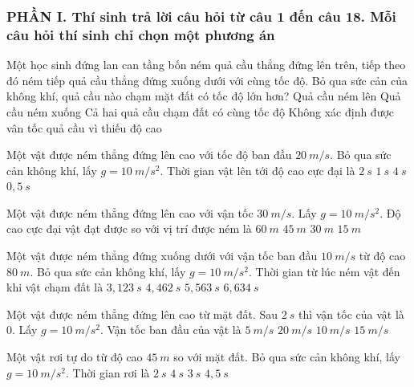\subsubsection*{PHẦN I. Thí sinh trả lời câu hỏi từ câu 1 đến câu 18. Mỗi câu hỏi thí sinh chỉ chọn một phương án}
\setcounter{ex}{0}
\begin{ex}%
Một học sinh đứng lan can tầng bốn ném quả cầu thẳng đứng lên trên, tiếp theo đó ném tiếp quả cầu thẳng đứng xuống dưới với cùng tốc độ. Bỏ qua sức cản của không khí, quả cầu nào chạm mặt đất có tốc độ lớn hơn?
\choice 
{Quả cầu ném lên}
{Quả cầu ném xuống}
{\True Cả hai quả cầu chạm đất có cùng tốc độ}
{Không xác định được vân tốc quả cầu vì thiếu độ cao}
\loigiai{}
\end{ex}
\begin{ex}
Một vật được ném thẳng đứng lên cao với tốc độ ban đầu $20\ m/s$. Bỏ qua sức cản không khí, lấy $g = 10\ m/s^2$. Thời gian vật lên tới độ cao cực đại là
\choice
{\True $2\ s$}
{$1\ s$}
{$4\ s$}
{$0,5\ s$}
\loigiai{}
\end{ex}

\begin{ex}
Một vật được ném thẳng đứng lên cao với vận tốc $30\ m/s$. Lấy $g = 10\ m/s^2$. Độ cao cực đại vật đạt được so với vị trí được ném là
\choice
{$60\ m$}
{\True $45\ m$}
{$30\ m$}
{$15\ m$}
\loigiai{}
\end{ex}

\begin{ex}
Một vật được ném thẳng đứng xuống dưới với vận tốc ban đầu $10\ m/s$ từ độ cao $80\ m$. Bỏ qua sức cản không khí, lấy $g = 10\ m/s^2$. Thời gian từ lúc ném vật đến khi vật chạm đất là
\choice
{$3,123\ s$}
{\True $4,462\ s$}
{$5,563\ s$}
{$6,634\ s$}
\loigiai{}
\end{ex}

\begin{ex}
Một vật được ném thẳng đứng lên cao từ mặt đất. Sau $2\ s$ thì vận tốc của vật là $0$. Lấy $g = 10\ m/s^2$. Vận tốc ban đầu của vật là
\choice
{$5\ m/s$}
{\True $20\ m/s$}
{$10\ m/s$}
{$15\ m/s$}
\loigiai{}
\end{ex}

\begin{ex}
Một vật rơi tự do từ độ cao $45\ m$ so với mặt đất. Bỏ qua sức cản không khí, lấy $g = 10\ m/s^2$. Thời gian rơi là
\choice
{$2\ s$}
{$4\ s$}
{\True $3\ s$}
{$4,5\ s$}
\loigiai{}
\end{ex}

